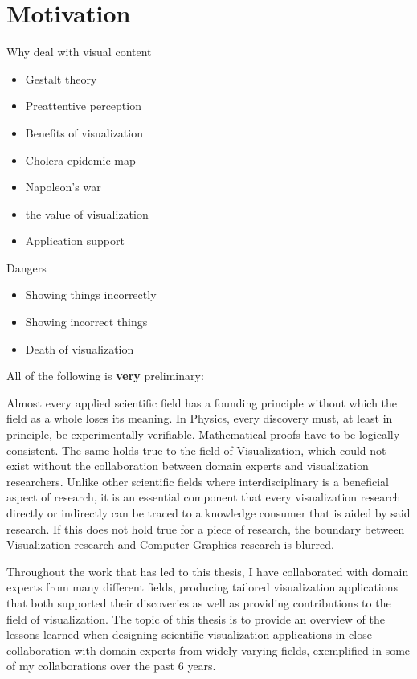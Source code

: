 \chapter{Motivation}
\label{ch:motivation}

Why deal with visual content
\begin{itemize}
\item Gestalt theory
\item Preattentive perception
\item Benefits of visualization
\item \cite{tufte1991envisioning} Cholera epidemic map
\item Napoleon's war
\item \cite{van2005value} the value of visualization
\item Application support
\end{itemize}

Dangers
\begin{itemize}
\item Showing things incorrectly
\item Showing incorrect things
\item \cite{lorensen2004death} Death of visualization

\end{itemize}

All of the following is \textbf{very} preliminary:


 Almost every applied scientific field has a founding principle without which the field as a whole loses its meaning. In Physics, every discovery must, at least in principle, be experimentally verifiable. Mathematical proofs have to be logically consistent. The same holds true to the field of Visualization, which could not exist without the collaboration between domain experts and visualization researchers. Unlike other scientific fields where interdisciplinary is a beneficial aspect of research, it is an essential component that every visualization research directly or indirectly can be traced to a knowledge consumer that is aided by said research. If this does not hold true for a piece of research, the boundary between Visualization research and Computer Graphics research is blurred.

Throughout the work that has led to this thesis, I have collaborated with domain experts from many different fields, producing tailored visualization applications that both supported their discoveries as well as providing contributions to the field of visualization. The topic of this thesis is to provide an overview of the lessons learned when designing scientific visualization applications in close collaboration with domain experts from widely varying fields, exemplified in some of my collaborations over the past 6 years.

